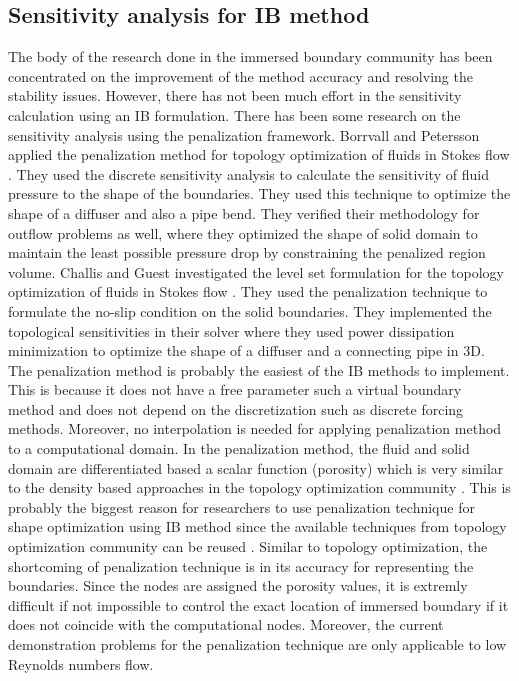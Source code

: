 \subsection{Sensitivity analysis for IB method}
The body of the research done in the immersed boundary community has been concentrated on the improvement of the method accuracy and resolving the stability issues. However, there has not been much effort in the sensitivity calculation using an IB formulation. There has been some research on the sensitivity analysis using the penalization framework. Borrvall and Petersson applied the penalization method for topology optimization of fluids in Stokes flow \cite{borrvall2003topology}. They used the discrete sensitivity analysis to calculate the sensitivity of fluid pressure to the shape of the boundaries. They used this technique to optimize the shape of a diffuser and also a pipe bend. They verified their methodology for outflow problems as well, where they optimized the shape of solid domain to maintain the least possible pressure drop by constraining the penalized region volume.  Challis and Guest investigated the level set formulation for the topology optimization of fluids in Stokes flow \cite{challis2009level}. They used the penalization technique to formulate the no-slip condition on the solid boundaries. They implemented the topological sensitivities in their solver where they used power dissipation minimization to optimize the shape of a diffuser and a connecting pipe in 3D. The penalization method is probably the easiest of the IB methods to implement. This is because it does not have a free parameter such a virtual boundary method and does not depend on the discretization such as discrete forcing methods. Moreover, no interpolation is needed for applying penalization method to a computational domain. In the penalization method, the fluid and solid domain are differentiated based a scalar function (porosity) which is very similar to the density based approaches in the topology optimization community \cite{deaton2014survey}. This is probably the biggest reason for researchers to use penalization technique for shape optimization using IB method since the available techniques from topology optimization community can be reused \cite{leveque1997immersed, pingen2007topology}. Similar to topology optimization, the shortcoming of penalization technique is in its accuracy for representing the boundaries. Since the nodes are assigned the porosity values, it is extremly difficult if not impossible to control the exact location of immersed boundary if it does not coincide with the computational nodes. Moreover, the current demonstration problems for the penalization technique are only applicable to low Reynolds numbers flow.


